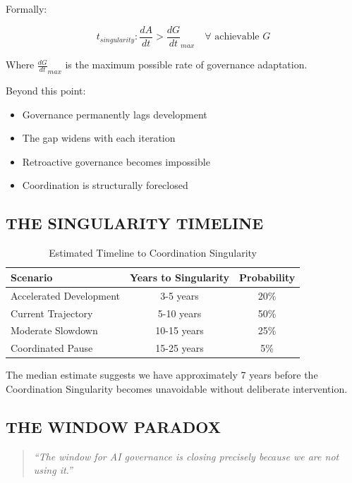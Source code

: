 \documentclass[11pt,letterpaper]{article}
\begin{document}
Formally:

\begin{equation}
t_{singularity}: \frac{dA}{dt} > \frac{dG}{dt}_{max} \quad \forall \text{ achievable } G
\label{eq:singularity}
\end{equation}

Where $\frac{dG}{dt}_{max}$ is the maximum possible rate of governance adaptation.

Beyond this point:
\begin{itemize}
\item Governance permanently lags development
\item The gap widens with each iteration
\item Retroactive governance becomes impossible
\item Coordination is structurally foreclosed
\end{itemize}

\subsection{THE SINGULARITY TIMELINE}

\begin{table}[H]
\centering
\caption{Estimated Timeline to Coordination Singularity}
\begin{tabular}{lcc}
\toprule
\textbf{Scenario} & \textbf{Years to Singularity} & \textbf{Probability} \\
\midrule
Accelerated Development & 3-5 years & 20\% \\
Current Trajectory & 5-10 years & 50\% \\
Moderate Slowdown & 10-15 years & 25\% \\
Coordinated Pause & 15-25 years & 5\% \\
\bottomrule
\end{tabular}
\label{tab:timeline}
\end{table}

The median estimate suggests we have approximately 7 years before the Coordination Singularity becomes unavoidable without deliberate intervention.

\subsection{THE WINDOW PARADOX}

\begin{quote}
\textit{``The window for AI governance is closing precisely because we are not using it.''}
\end{quote}
\end{document}
